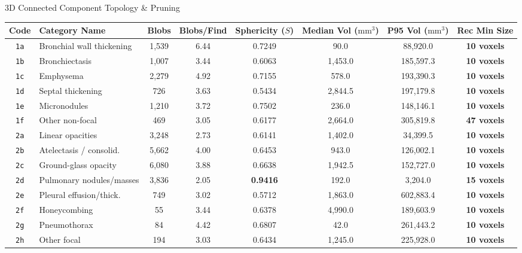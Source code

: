 \documentclass[aspectratio=169, 10pt]{beamer}
\begin{document}
\begin{frame}{3D Connected Component Topology \& Pruning}
    \centering
    \scriptsize
    \setlength{\tabcolsep}{3.8pt}
    \begin{tabular}{clccccc>{\bfseries}c}
        \toprule
        \textbf{Code} & \textbf{Category Name} & \textbf{Blobs} & \textbf{Blobs/Find} & \textbf{Sphericity ($S$)} & \textbf{Median Vol ($\text{mm}^3$)} & \textbf{P95 Vol ($\text{mm}^3$)} & Rec Min Size \\
        \midrule
        \texttt{1a} & Bronchial wall thickening & 1,539 & 6.44 & 0.7249 & 90.0 & 88,920.0 & 10 voxels \\
        \texttt{1b} & Bronchiectasis           & 1,007 & 3.44 & 0.6063 & 1,453.0 & 185,597.3 & 10 voxels \\
        \texttt{1c} & Emphysema                & 2,279 & 4.92 & 0.7155 & 578.0 & 193,390.3 & 10 voxels \\
        \texttt{1d} & Septal thickening        & 726 & 3.63 & 0.5434 & 2,844.5 & 197,179.8 & 10 voxels \\
        \texttt{1e} & Micronodules             & 1,210 & 3.72 & 0.7502 & 236.0 & 148,146.1 & 10 voxels \\
        \rowcolor{darkblue!10}
        \texttt{1f} & Other non-focal          & 469 & 3.05 & 0.6177 & 2,664.0 & 305,819.8 & \textbf{47 voxels} \\
        \texttt{2a} & Linear opacities         & 3,248 & 2.73 & 0.6141 & 1,402.0 & 34,399.5 & 10 voxels \\
        \texttt{2b} & Atelectasis / consolid.  & 5,662 & 4.00 & 0.6453 & 943.0 & 126,002.1 & 10 voxels \\
        \texttt{2c} & Ground-glass opacity     & 6,080 & 3.88 & 0.6638 & 1,942.5 & 152,727.0 & 10 voxels \\
        \rowcolor{darkblue!10}
        \texttt{2d} & Pulmonary nodules/masses & 3,836 & 2.05 & \textbf{0.9416} & 192.0 & 3,204.0 & \textbf{15 voxels} \\
        \texttt{2e} & Pleural effusion/thick.  & 749 & 3.02 & 0.5712 & 1,863.0 & 602,883.4 & 10 voxels \\
        \texttt{2f} & Honeycombing             & 55  & 3.44 & 0.6378 & 4,990.0 & 189,603.9 & 10 voxels \\
        \texttt{2g} & Pneumothorax             & 84  & 4.42 & 0.6807 & 42.0 & 261,443.2 & 10 voxels \\
        \texttt{2h} & Other focal              & 194 & 3.03 & 0.6434 & 1,245.0 & 225,928.0 & 10 voxels \\
        \bottomrule
    \end{tabular}


\end{frame}
\end{document}
